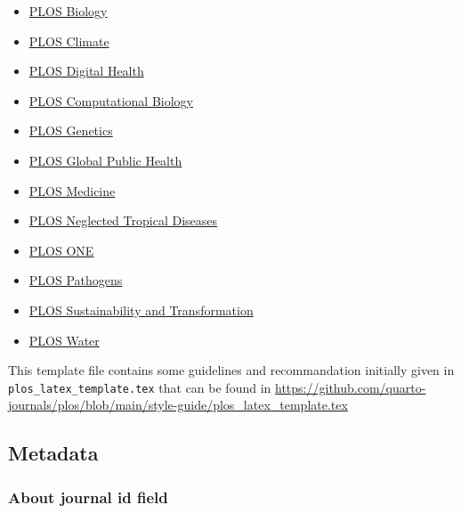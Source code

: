 \documentclass[
  10pt,
  letterpaper,
]{article}
\providecommand{\tightlist}{%
  \setlength{\itemsep}{0pt}\setlength{\parskip}{0pt}}\usepackage{longtable,booktabs,array}
\begin{document}
\begin{itemize}
\tightlist
\item
  \href{https://journals.plos.org/plosbiology/s/submission-guidelines}{PLOS
  Biology}
\item
  \href{https://journals.plos.org/climate/s/submission-guidelines}{PLOS
  Climate}
\item
  \href{https://journals.plos.org/digitalhealth/s/submission-guidelines}{PLOS
  Digital Health}
\item
  \href{https://journals.plos.org/ploscompbiol/s/submission-guidelines}{PLOS
  Computational Biology}
\item
  \href{https://journals.plos.org/plosgenetics/s/submission-guidelines}{PLOS
  Genetics}
\item
  \href{https://journals.plos.org/globalpublichealth/s/submission-guidelines}{PLOS
  Global Public Health}
\item
  \href{https://journals.plos.org/plosmedicine/s/submission-guidelines}{PLOS
  Medicine}
\item
  \href{https://journals.plos.org/plosntds/s/submission-guidelines}{PLOS
  Neglected Tropical Diseases}
\item
  \href{https://journals.plos.org/plosone/s/submission-guidelines}{PLOS
  ONE}
\item
  \href{https://journals.plos.org/plospathogens/s/submission-guidelines}{PLOS
  Pathogens}
\item
  \href{https://journals.plos.org/sustainabilitytransformation/s/submission-guidelines}{PLOS
  Sustainability and Transformation}
\item
  \href{https://journals.plos.org/water/s/submission-guidelines}{PLOS
  Water}
\end{itemize}

This template file contains some guidelines and recommandation initially
given in \texttt{plos\_latex\_template.tex} that can be found in
\url{https://github.com/quarto-journals/plos/blob/main/style-guide/plos_latex_template.tex}

\subsection{Metadata}\label{metadata}

\subsubsection{About journal id field}\label{about-journal-id-field}
\end{document}
